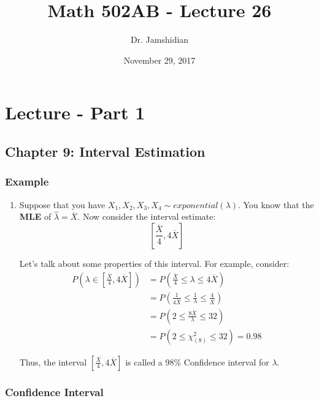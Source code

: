 \documentclass{article}
\title{Math 502AB - Lecture 26}
\author{Dr. Jamshidian}
\date{November 29, 2017}
\begin{document}
\maketitle

\section{Lecture - Part 1}

\subsection{Chapter 9: Interval Estimation}

\subsubsection*{Example}
\begin{enumerate}
    \item Suppose that you have $X_1,X_2,X_3,X_4 \sim exponential(\lambda)$. You know that the \textbf{MLE} of $\hat{\lambda} = \overline{X}$. Now consider the interval estimate:
    \begin{equation*}
        \left[ \frac{\overline{X}}{4}, 4\overline{X} \right]
    \end{equation*}
    
    Let's talk about some properties of this interval. For example, consider:
    \begin{equation*}
    \begin{split}
        P\left(\lambda \in  \left[ \frac{\overline{X}}{4}, 4\overline{X} \right] \right) &= P\left(\frac{\overline{X}}{4} \leq \lambda \leq 4 \overline{X}\right)\\
        &= P\left(\frac{1}{4\overline{X}} \leq \frac{1}{\lambda} \leq \frac{4}{\overline{X}} \right)\\ 
        &= P\left(2 \leq \frac{8\overline{X}}{\lambda} \leq 32 \right)\\
        &= P(2 \leq \chi^2_{(8)} \leq 32) = 0.98
    \end{split}
    \end{equation*}
    
    Thus, the interval $\left[ \frac{\overline{X}}{4}, 4\overline{X} \right]$ is called a 98\% Confidence interval for $\lambda$.
\end{enumerate}

\subsubsection{Confidence Interval}
\end{document}
